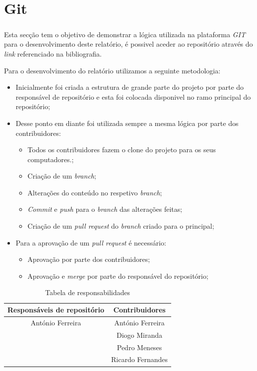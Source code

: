 \chapter*{\thechapter \quad Git}
\paragraph{}

Esta secção tem o objetivo de demonstrar a lógica utilizada na plataforma \textit{GIT} para o desenvolvimento deste relatório, é possivel aceder ao repositório através do \textit{link} referenciado na bibliografia.

Para o desenvolvimento do relatório utilizamos a seguinte metodologia:
\begin{itemize}
    \item Inicialmente foi criada a estrutura de grande parte do projeto por parte do responsável de repositório e esta foi colocada disponivel no ramo principal do repositório;
    \item Desse ponto em diante foi utilizada sempre a mesma lógica por parte dos contribuidores:
    \begin{itemize}
    \item Todos os contribuidores fazem o clone do projeto para os seus computadores.;
    \item Criação de um \textit{branch};
    \item Alterações do conteúdo no respetivo \textit{branch};
    \item \textit{Commit} e \textit{push} para o \textit{branch} das alterações feitas;
    \item Criação de um \textit{pull request} do \textit{branch} criado para o principal;
    \end{itemize}
    
    \item Para a aprovação de um \textit{pull request} é necessário:
    \begin{itemize}
    \item Aprovação por parte dos contribuidores;
    \item Aprovação e \textit{merge} por parte do responsável do repositório;
    \end{itemize}
\end{itemize}

\begin{table} 
\begin{center}
\begin{tabular}{||c c||} 
 \hline
 Responsáveis de repositório & Contribuidores  \\ [0.5ex] 
 \hline\hline
 António Ferreira & António Ferreira \\ 
 \hline
  & Diogo Miranda \\
 \hline
  & Pedro Meneses \\
 \hline
  & Ricardo Fernandes \\ [1ex] 
 \hline
\end{tabular}
\caption{Tabela de responsabilidades}
\label{table: Tabela de responsabilidades}
\end{center}
\end{table}

